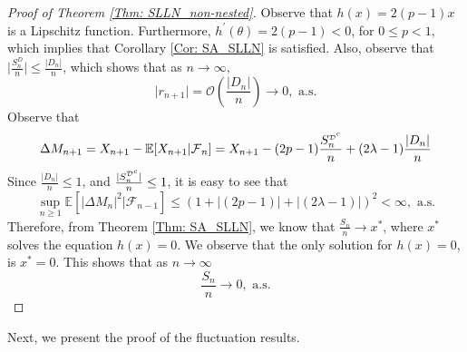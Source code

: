 \documentclass{article}
\numberwithin{equation}{section}
\newcommand{\FF}{\mbox{${\mathcal F}$}}
\newcommand{\DD}{\mbox{${\mathcal D}$}}
\newcommand{\1}{\mathbf{1}}
\newcommand{\0}{\mathbf{0}}
\newcommand{\E}{\mbox{${\mathbb E}$}}
\begin{document}
\begin{proof}[Proof of Theorem \ref{Thm: SLLN_non-nested}]
Observe that $h(x)=2(p-1)x$ is a Lipschitz function.
Furthermore, $h^{'}(\theta)= 2(p-1)<0$, for $0 \le p <1$, which implies that Corollary \ref{Cor: SA_SLLN} is satisfied. Also, observe that $\lvert \frac{S_n^{D}}{n}\rvert \le \frac{\lvert D_n \rvert}{n}$, which shows that as $n \to \infty,$
\begin{equation}
\label{Eq: error_D_n_converge_to_zero}
\lvert r_{n+1}\rvert = \mathcal{O}\left(\frac{\lvert D_n \rvert}{n}\right)\rightarrow 0, \text{ a.s.}
\end{equation}
Observe that 
\begin{equation}
\label{Eq: martingale_difference_Dn_n_cgs_zero}
\Delta M_{n+1} = X_{n+1} - \E[ X_{n+1} | \FF_n]= X_{n+1}-(2p-1) \frac{S_n^{{\tiny \DD}^c}}{n} + (2\lambda-1) \frac{|D_n|}{n}
\end{equation}
Since $\frac{\lvert D_n \rvert}{n} \le 1$, and $\frac{\lvert S_n^{{\tiny \DD}^c}\rvert }{n} \le 1$, it is easy to see that 
\begin{equation}\label{Eq: boundedness of martingale trivial case}
    \sup_{n \ge 1} \E[| \Delta M_n |^2 \vert \FF_{n-1}] \le (1+\lvert (2p-1)\rvert + \lvert (2\lambda-1)\rvert)^2 < \infty, \text{ a.s.}
\end{equation} 
Therefore, from Theorem \ref{Thm: SA_SLLN}, we know that 
$\frac{S_n}{n} \rightarrow x^*$, where $x^*$ solves the equation $h(x)=0$. We observe that the only solution for $h(x)=0$, is $x^{*}=0$. This shows that as $n \to \infty$
\[
\frac{S_n}{n} \rightarrow 0, \text{ a.s.}
\]
\end{proof}
Next, we present the proof of the fluctuation results. 
\end{document}

